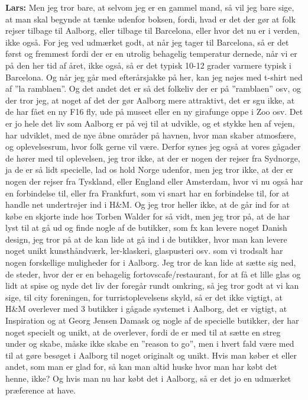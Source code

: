 \textbf{Lars:} Men jeg tror bare, at selvom jeg er en gammel mand, så vil jeg bare sige, at man skal begynde at tænke udenfor boksen, fordi, hvad er det der gør at folk rejser tilbage til Aalborg, eller tilbage til Barcelona, eller hvor det nu er i verden, ikke også. For jeg ved udmærket godt, at når jeg tager til Barcelona, så er det først og fremmest fordi der er en utrolig behagelig temperatur dernede, når vi er på den her tid af året, ikke også, så er det typisk 10-12 grader varmere typisk i Barcelona. Og når jeg går med efterårsjakke på her, kan jeg nøjes med t-shirt ned af ”la ramblaen”. Og det andet det er så det folkeliv der er på ”ramblaen” osv, og der tror jeg, at noget af det der gør Aalborg mere attraktivt, det er sgu ikke, at de har fået en ny F16 fly, ude på museet eller en ny girafunge oppe i Zoo osv. Det er jo hele det liv som Aalborg er på vej til at udvikle, og et stykke hen af vejen, har udviklet, med de nye åbne områder på havnen, hvor man skaber atmosfære, og oplevelsesrum, hvor folk gerne vil være. Derfor synes jeg også at vores gågader de hører med til oplevelsen, jeg tror ikke, at der er nogen der rejser fra Sydnorge, ja de er så lidt specielle, lad os hold Norge udenfor, men jeg tror ikke, at der er nogen der rejser fra Tyskland, eller England eller Amsterdam, hvor vi nu også har en forbindelse til, eller fra Frankfurt, som vi snart har en forbindelse til, for at handle net undertrøjer ind i H\&M. Og jeg tror heller ikke, at de går ind for at købe en skjorte inde hos Torben Walder for så vidt, men jeg tror på, at de har lyst til at gå ud og finde nogle af de butikker, som fx kan levere noget Danish design, jeg tror på at de kan lide at gå ind i de butikker, hvor man kan levere noget unikt kunsthåndværk, ler-klaskeri, glaspusteri osv. som vi trodsalt har nogen forskellige muligheder for i Aalborg. Jeg tror de kan lide at sætte sig ned, de steder, hvor der er en behagelig fortovscafe/restaurant, for at få et lille glas og lidt at spise og nyde det liv der foregår rundt omkring, så jeg tror godt at vi kan sige, til city foreningen, for turristoplevelsens skyld, så er det ikke vigtigt, at H\&M overlever med 3 butikker i gågade systemet i Aalborg, det er vigtigt, at Inspiration og at Georg Jensen Damask og nogle af de specielle butikker, der har noget specielt og unikt, at de overlever, fordi de er med til at sætte en streg under og skabe, måske ikke skabe en ”reason to go”, men i hvert fald være med til at gøre besøget i Aalborg til noget originalt og unikt. Hvis man køber et eller andet, som man er glad for, så kan man altid huske hvor man har købt det henne, ikke? Og hvis man nu har købt det i Aalborg, så er det jo en udmærket præference at have. \newline

